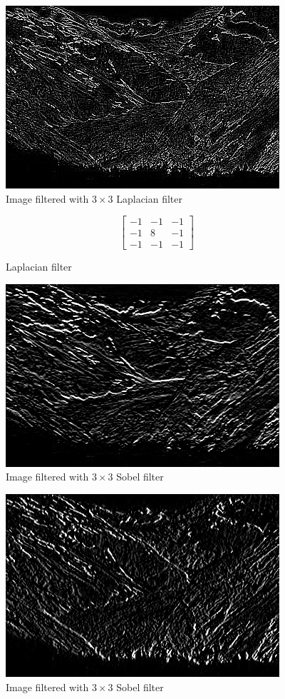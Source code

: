 \documentclass{article}
\begin{document}
\begin{figure}[H]
	\centering
	\includegraphics[width=288pt]{../result/filter-laplacian.png}
	\caption{Image filtered with $3 \times 3$ Laplacian filter}
\end{figure}

\begin{figure}[H]
	\centering
		\[ \begin{bmatrix}
			-1 & -1 & -1 \\
			-1 &  8 & -1 \\
			-1 & -1 & -1
		\end{bmatrix} \]
\caption{Laplacian filter}
\end{figure}

\begin{figure}[H]
	\centering
	\includegraphics[width=288pt]{../result/filter-sobel-0.png}
	\caption{Image filtered with $3 \times 3$ Sobel filter}
\end{figure}

\begin{figure}[H]
	\centering
	\includegraphics[width=288pt]{../result/filter-sobel-1.png}
	\caption{Image filtered with $3 \times 3$ Sobel filter}
\end{figure}
\end{document}
